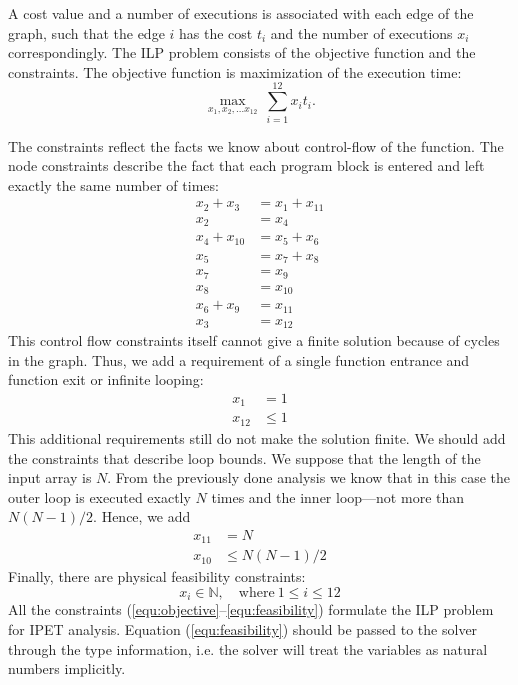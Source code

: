 \documentclass[12pt,a4paper,titlepage,oneside]{article}
\begin{document}
\begin{itemize}
A cost value and a number of executions is associated with each edge of the graph, such that the edge $i$ has the cost $t_i$ and the number of executions $x_i$ correspondingly.
The ILP problem consists of the objective function and the constraints.
The objective function is maximization of the execution time:
\begin{equation}
\max_{x_1, x_2, \ldots x_{12}} \ \sum_{i=1}^{12} x_i t_i.
\label{equ:objective}
\end{equation}

The constraints reflect the facts we know about control-flow of the function.
The node constraints describe the fact that each program block is entered and left exactly the same number of times:
\begin{equation}
	\left.\begin{aligned}
		x_2 + x_3	&= x_1 + x_{11}\\
		x_2			&= x_4\\
		x_4 + x_{10}	&= x_5 + x_6\\
		x_5			&= x_7 + x_8\\
		x_7			&= x_9\\
		x_8			&= x_{10}\\
		x_6 + x_9	&= x_{11}\\
		x_3			&= x_{12}
	\end{aligned}\right.
\label{equ:node}
\end{equation}
This control flow constraints itself cannot give a finite solution because of cycles in the graph.
Thus, we add a requirement of a single function entrance and function exit or infinite looping:
\begin{equation}
	\left.\begin{aligned}
		x_1			&= 1\\
		x_{12}		&\leq 1
	\end{aligned}\right.
\label{equ:single}
\end{equation}
This additional requirements still do not make the solution finite.
We should add the constraints that describe loop bounds.
We suppose that the length of the input array is $N$.
From the previously done analysis we know that in this case the outer loop is executed exactly $N$ times and the inner loop---not more than $N(N-1)/2$.
Hence, we add
\begin{equation}
	\left.\begin{aligned}
		x_{11}		&= N\\
		x_{10}		&\leq N(N-1)/2
	\end{aligned}\right.
\label{equ:loops}
\end{equation}
Finally, there are physical feasibility constraints:
\begin{equation}
		x_i \in \mathbb{N}, \quad \mathrm{where}\ 1 \leq i \leq 12
\label{equ:feasibility}
\end{equation}
All the constraints (\ref{equ:objective}--\ref{equ:feasibility}) formulate the ILP problem for IPET analysis.
Equation (\ref{equ:feasibility}) should be passed to the solver through the type information, i.e. the solver will treat the variables as natural numbers implicitly.


\end{itemize}
\end{document}
